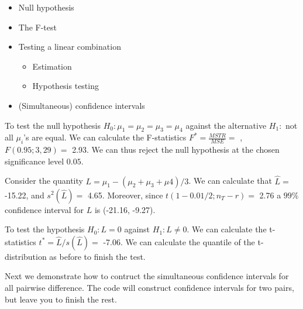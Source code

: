 \documentclass[12pt,]{book}
\providecommand{\tightlist}{%
  \setlength{\itemsep}{0pt}\setlength{\parskip}{0pt}}
\begin{document}
\begin{itemize}
\tightlist
\item
  Null hypothesis
\item
  The F-test
\item
  Testing a linear combination

  \begin{itemize}
  \tightlist
  \item
    Estimation
  \item
    Hypothesis testing
  \end{itemize}
\item
  (Simultaneous) confidence intervals
\end{itemize}

To test the null hypothesis \(H_0: \mu_1=\mu_2=\mu_3=\mu_4\) against the
alternative \(H_1:\) not all \(\mu_i\)'s are equal. We can calculate the
F-statistics \(F^*=\frac{MSTR}{MSE}=\) , \(F(0.95;3,29)=\) 2.93. We can
thus reject the null hypothesis at the chosen significance level
\(0.05\).

Consider the quantity \(L=\mu_1-(\mu_2+\mu_3+\mu4)/3\). We can calculate
that \(\hat{L}=\) -15.22, and \(s^2(\hat{L})=\) 4.65. Moreover, since
\(t(1-0.01/2;n_T-r)=\) 2.76 a \(99\%\) confidence interval for \(L\) is
(-21.16, -9.27).

To test the hypothesis \(H_0: L=0\) against \(H_1: L \neq 0\). We can
calculate the t-statistics \(t^*=\hat{L}/s(\hat{L})=\) -7.06. We can
calculate the quantile of the t-distribution as before to finish the
test.

Next we demonstrate how to contruct the simultaneous confidence
intervals for all pairwise difference. The code will construct
confidence intervals for two pairs, but leave you to finish the rest.
\end{document}
